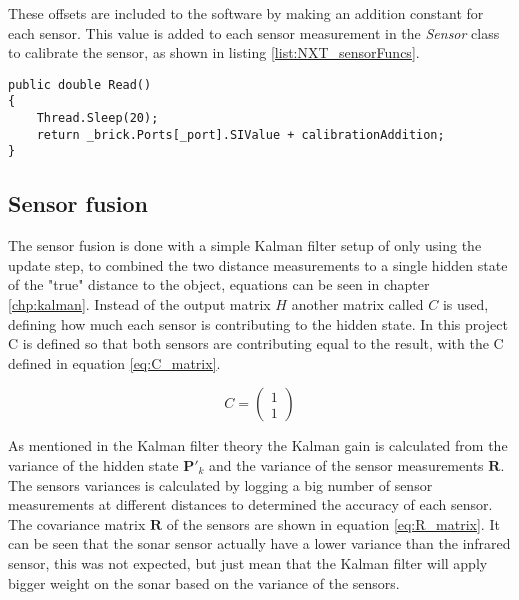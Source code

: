 \pagebreak


These offsets are included to the software by making an addition constant for each sensor.
This value is added to each sensor measurement in the \emph{Sensor} class to calibrate the sensor, as shown in listing \ref{list:NXT_sensorFuncs}.

\begin{lstlisting}[caption={The function for reading and calibrate the sensor measurements, from the sensor class}, label=list:NXT_sensorFuncs]
public double Read()
{
	Thread.Sleep(20);
	return _brick.Ports[_port].SIValue + calibrationAddition;
}
\end{lstlisting}

\subsection{Sensor fusion}

The sensor fusion is done with a simple Kalman filter setup of only using the update step, to combined the two distance measurements to a single hidden state of the "true" distance to the object, equations can be seen in chapter \ref{chp:kalman}.
Instead of the output matrix \emph{$H$} another matrix called \emph{$C$} is used, defining how much each sensor is contributing to the hidden state.
In this project C is defined so that both sensors are contributing equal to the result, with the C defined in equation \ref{eq:C_matrix}.

\begin{equation}
\label{eq:C_matrix}
C = 
\begin{pmatrix}
1 \\
1
\end{pmatrix}
\end{equation}

As mentioned in the Kalman filter theory the Kalman gain is calculated from the variance of the hidden state $\boldsymbol{P}'_{k}$ and the variance of the sensor measurements $\boldsymbol{R}$.
The sensors variances is calculated by logging a big number of sensor measurements at different distances to determined the accuracy of each sensor.
The covariance matrix $\boldsymbol{R}$ of the sensors are shown in equation \ref{eq:R_matrix}.
It can be seen that the sonar sensor actually have a lower variance than the infrared sensor, this was not expected, but just mean that the Kalman filter will apply bigger weight on the sonar based on the variance of the sensors.

